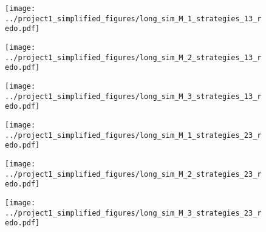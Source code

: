 \documentclass[13pt]{amsart}
\begin{document}
\clearpage

\begin{figure}[h]
    \texttt{[image: ../project1\_simplified\_figures/long\_sim\_M\_1\_strategies\_13\_redo.pdf]}
\end{figure}
\begin{figure}[h]
    \texttt{[image: ../project1\_simplified\_figures/long\_sim\_M\_2\_strategies\_13\_redo.pdf]}
\end{figure}
\begin{figure}[h]
    \texttt{[image: ../project1\_simplified\_figures/long\_sim\_M\_3\_strategies\_13\_redo.pdf]}
\end{figure}

\clearpage

\begin{figure}[h]
    \texttt{[image: ../project1\_simplified\_figures/long\_sim\_M\_1\_strategies\_23\_redo.pdf]}
\end{figure}
\begin{figure}[h]
    \texttt{[image: ../project1\_simplified\_figures/long\_sim\_M\_2\_strategies\_23\_redo.pdf]}
\end{figure}
\begin{figure}[h]
    \texttt{[image: ../project1\_simplified\_figures/long\_sim\_M\_3\_strategies\_23\_redo.pdf]}
\end{figure}
\end{document}
